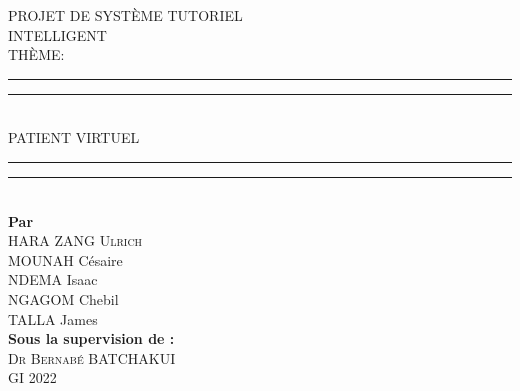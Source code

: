 \begin{titlingpage}
\begin{singlespace}
\begin{center}
    \end{center}
    \vspace*{0.5mm}
    \begin{center}
    	{\LARGE\textsc{PROJET DE SYSTÈME TUTORIEL}\\ \vspace*{3mm} {INTELLIGENT }}\\
    	\vspace{5mm}
    	{\large\textsc{THÈME:}}\\
    	\vspace{5mm}
        \rule[0.5ex]{\linewidth}{2pt}\vspace*{-\baselineskip}\vspace*{3.2pt}
        \rule[0.5ex]{\linewidth}{1pt}\\[\baselineskip]
        {\large PATIENT VIRTUEL }\\[4mm]
        \rule[0.5ex]{\linewidth}{1pt}\vspace*{-\baselineskip}\vspace{3.2pt}
        \rule[0.5ex]{\linewidth}{2pt}\\
        \vspace{4mm}
        {\large \textbf{Par}}\\
        \vspace{3mm}
        {\large\textsc{HARA ZANG Ulrich} \\ MOUNAH Césaire \\ NDEMA Isaac\\ NGAGOM Chebil \\ TALLA James}\\
        \vspace{5mm}
        {\large \textbf{Sous la supervision de :}\\
        	\vspace{5mm}
        \textsc{Dr Bernabé BATCHAKUI}}\\
        \vspace{4mm}
        {\large\textsc{GI 2022}}
    \end{center}

\end{singlespace}
\end{titlingpage}

\restoregeometry
